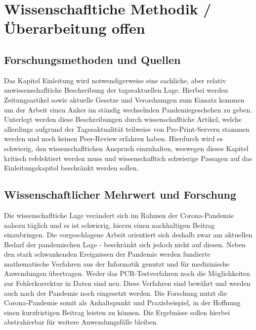 
\chapter{Wissenschafltiche Methodik  / Überarbeitung offen}
\section{Forschungsmethoden und Quellen}
Das Kapitel Einleitung wird notwendigerweise eine sachliche, aber relativ unwissenschafltiche Beschreibung der tagesaktuellen Lage.
Hierbei werden Zeitungsartikel sowie aktuelle Gesetze und Verordnungen zum Einsatz kommen um der Arbeit einen Anker im ständig wechselnden Pandemiegeschehen zu geben.
Unterlegt werden diese Beschreibungen durch wissenschafltiche Artikel, welche allerdings aufgrund der Tagesaktualität teilweise von Pre-Print-Servern stammen werden und noch keinen Peer-Review erfahren haben.
Hierdurch wird es schwierig, den wissenschafltichen Anspruch einzuhalten, weswegen dieses Kapitel kritisch refelektiert werden muss und wissenschafltich schwierige Passagen auf das Einleitungskapitel beschränkt werden sollen.

\section{Wissenschaftlicher Mehrwert und Forschung}
Die wissenschafltiche Lage verändert sich im Rahmen der Corona-Pandemie nahezu täglich und es ist schwierig, hierzu einen nachhaltigen Beitrag einzubringen.
Die vorgeschlagene Arbeit orientiert sich deshalb zwar am aktuellen Bedarf der pandemischen Lage - beschränkt sich jedoch nicht auf diesen.
Neben den stark schwankenden Ereignissen der Pandemie werden fundierte mathematische Verfahren aus der Informatik genutzt und für medizinische Anwendungen übertragen.
Weder das PCR-Testverfahren noch die Möglichkeiten zur Fehlerkorrektur in Daten sind neu.
Diese Verfahren sind bewährt und werden auch nach der Pandemie noch eingesetzt werden.
Die Forschung nutzt die Corona-Pandemie somit als Anhaltspunkt und Praxisbeispiel, in der Hoffnung einen kurzfristigen Beitrag leisten zu können.
Die Ergebnisse sollen hierbei abstrahierbar für weitere Anwendungsfälle bleiben. \cite{Testbuch}